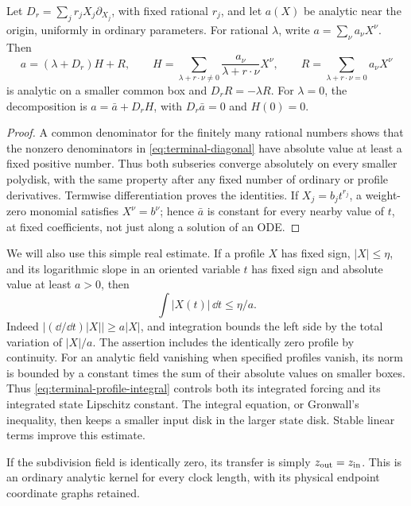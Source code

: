 \begin{lemma}\label{lem:terminal-diagonal}
Let \(D_r=\sum_j r_jX_j\partial_{X_j}\), with fixed rational \(r_j\), and
let \(a(X)\) be analytic near the origin, uniformly in ordinary parameters.
For rational \(\lambda\), write \(a=\sum_\nu a_\nu X^\nu\).  Then
\begin{equation}\label{eq:terminal-diagonal}
 a=(\lambda+D_r)H+R,\qquad
 H=\sum_{\lambda+r\cdot\nu\ne0}
       \frac{a_\nu}{\lambda+r\cdot\nu}X^\nu,
 \qquad
 R=\sum_{\lambda+r\cdot\nu=0}a_\nu X^\nu
\end{equation}
is analytic on a smaller common box and \(D_rR=-\lambda R\).
For \(\lambda=0\), the decomposition is \(a=\bar a+D_rH\), with
\(D_r\bar a=0\) and \(H(0)=0\).
\end{lemma}
\begin{proof}
A common denominator for the finitely many rational numbers shows that the
nonzero denominators in \eqref{eq:terminal-diagonal} have absolute value at
least a fixed positive number.  Thus both subseries converge absolutely on
every smaller polydisk, with the same property after any fixed number of
ordinary or profile derivatives.  Termwise differentiation proves the
identities.  If \(X_j=b_jt^{r_j}\), a weight-zero monomial satisfies
\(X^\nu=b^\nu\); hence \(\bar a\) is constant for every nearby value of
\(t\), at fixed coefficients, not just along a solution of an ODE.
\end{proof}

We will also use this simple real estimate.  If a profile \(X\) has fixed
sign, \(|X|\le\eta\), and its logarithmic slope in an oriented variable
\(t\) has fixed sign and absolute value at least \(a>0\), then
\begin{equation}\label{eq:terminal-profile-integral}
 \int |X(t)|\,\dd t\le \eta/a.
\end{equation}
Indeed \(|(\dd/\dd t)|X||\ge a|X|\), and integration bounds the left side
by the total variation of \(|X|/a\).  The assertion includes the identically
zero profile by continuity.  For an analytic field vanishing when specified
profiles vanish, its norm is bounded by a constant times the sum of their
absolute values on smaller boxes.  Thus \eqref{eq:terminal-profile-integral}
controls both its integrated forcing and its integrated state Lipschitz
constant.  The integral equation, or Gronwall's inequality, then keeps a
smaller input disk in the larger state disk.  Stable linear terms improve
this estimate.

If the subdivision field is identically zero, its transfer is simply
\(z_{\rm out}=z_{\rm in}\).  This is an ordinary analytic kernel for
every clock length, with its physical endpoint coordinate graphs retained.

